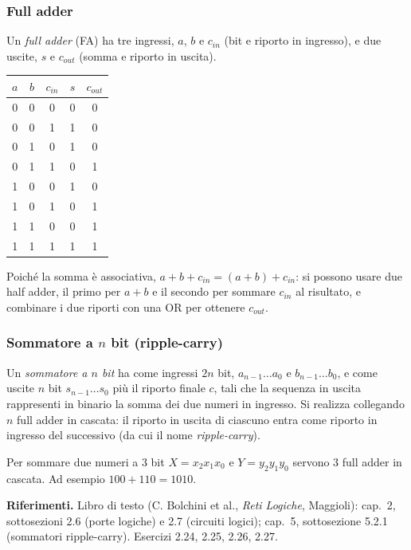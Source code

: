 \documentclass[11pt,a4paper]{article}
\begin{document}
\subsubsection{Full adder}

Un \emph{full adder} (FA) ha tre ingressi, $a$, $b$ e $c_{in}$ (bit e riporto in ingresso), e due uscite, $s$ e $c_{out}$ (somma e riporto in uscita).
\begin{center}
\begin{tabular}{ccc|cc}
\toprule
$a$ & $b$ & $c_{in}$ & $s$ & $c_{out}$ \\
\midrule
0 & 0 & 0 & 0 & 0 \\
0 & 0 & 1 & 1 & 0 \\
0 & 1 & 0 & 1 & 0 \\
0 & 1 & 1 & 0 & 1 \\
1 & 0 & 0 & 1 & 0 \\
1 & 0 & 1 & 0 & 1 \\
1 & 1 & 0 & 0 & 1 \\
1 & 1 & 1 & 1 & 1 \\
\bottomrule
\end{tabular}
\end{center}
Poiché la somma è associativa, $a + b + c_{in} = (a + b) + c_{in}$: si possono usare due half adder, il primo per $a + b$ e il secondo per sommare $c_{in}$ al risultato, e combinare i due riporti con una OR per ottenere $c_{out}$.

\subsubsection{Sommatore a $n$ bit (ripple-carry)}

Un \emph{sommatore a $n$ bit} ha come ingressi $2n$ bit, $a_{n-1} \dots a_0$ e $b_{n-1} \dots b_0$, e come uscite $n$ bit $s_{n-1} \dots s_0$ più il riporto finale $c$, tali che la sequenza in uscita rappresenti in binario la somma dei due numeri in ingresso. Si realizza collegando $n$ full adder in cascata: il riporto in uscita di ciascuno entra come riporto in ingresso del successivo (da cui il nome \emph{ripple-carry}).

\begin{esempio}
Per sommare due numeri a $3$ bit $X = x_2 x_1 x_0$ e $Y = y_2 y_1 y_0$ servono $3$ full adder in cascata. Ad esempio $100 + 110 = 1010$.
\end{esempio}

\medskip
\noindent\textbf{Riferimenti.} Libro di testo (C. Bolchini et al., \emph{Reti Logiche}, Maggioli): cap.\ 2, sottosezioni 2.6 (porte logiche) e 2.7 (circuiti logici); cap.\ 5, sottosezione 5.2.1 (sommatori ripple-carry). Esercizi 2.24, 2.25, 2.26, 2.27.
\end{document}
